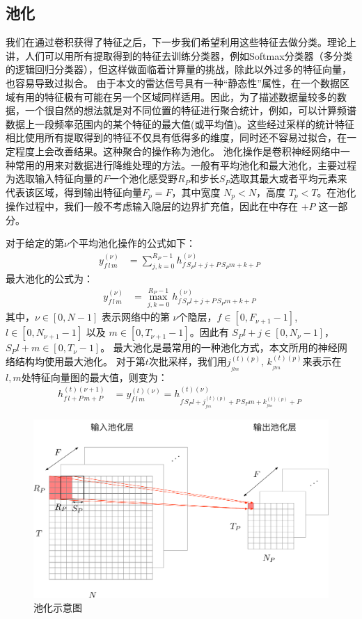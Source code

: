 \subsection{池化}
我们在通过卷积获得了特征之后，下一步我们希望利用这些特征去做分类。理论上讲，人们可以用所有提取得到的特征去训练分类器，例如Softmax分类器（多分类的逻辑回归分类器），但这样做面临着计算量的挑战，除此以外过多的特征向量，也容易导致过拟合。
由于本文的雷达信号具有一种“静态性”属性，在一个数据区域有用的特征极有可能在另一个区域同样适用。因此，为了描述数据量较多的数据，一个很自然的想法就是对不同位置的特征进行聚合统计，例如，可以计算频谱数据上一段频率范围内的某个特征的最大值(或平均值)。这些经过采样的统计特征相比使用所有提取得到的特征不仅具有低得多的维度，同时还不容易过拟合，在一定程度上会改善结果。这种聚合的操作称为池化。
池化操作是卷积神经网络中一种常用的用来对数据进行降维处理的方法。一般有平均池化和最大池化，主要过程为选取输入特征向量的$F$一个池化感受野$R_P$和步长$S_P$选取其最大或者平均元素来代表该区域，得到输出特征向量$F_p=F$，其中宽度 $N_p<N$，高度 $T_p<T$。在池化操作过程中，我们一般不考虑输入隐层的边界扩充值，因此在中存在 $+P$ 这一部分。

对于给定的第$\nu$个平均池化操作的公式如下：
\begin{align}
  y_{f\,l\,m}^{(\nu)}&=\sum^{R_P-1}_{j,k=0} h_{f\,S_P l+j+P\,S_Pm+k+P}^{(\nu)}\;
  \label{equ:pool}
\end{align}
最大池化的公式为：
\begin{align}
  y_{f\,l\,m}^{(\nu)}&=\max^{R_P-1}_{j,k=0} h_{f\,S_P l+j+P\,S_Pm+k+P}^{(\nu)}\;
  \label{equ:maxpool}
\end{align}
其中，$\nu \in [0,N-1 ]$ 表示网络中的第 $\nu$个隐层，$f\in[0,F_{\nu+1}-1]$, $l\in[0,N_{\nu+1}-1 ]$ 以及 $m\in[0,T_{\nu+1}-1 ]$。因此有 $S_Pl+j\in[0,N_\nu-1 ]$， $S_Pl+m\in[0,T_\nu-1 ]$。
最大池化是最常用的一种池化方式，本文所用的神经网络结构均使用最大池化。
对于第$t$次批采样，我们用$j^{(t)(p)}_{_{flm}},\,k^{(t)(p)}_{_{flm}}$来表示在 $l,m$处特征向量图的最大值，则变为：
\begin{align}
h_{f\,l+P\,m+P}^{(t)(\nu+1)}&=y_{f\,l\,m}^{(t)(\nu)}=
%
h^{(t)(\nu)}_{f\,S_P l+j^{(t)(p)}_{_{flm}}+P\,S_Pm+k^{(t)(p)}_{_{flm}}+P}\;
\end{align}

\begin{figure}[!t]
	\centering
	\includegraphics[width=13.5cm]{figures/networks/pooling}
	\caption{池化示意图}
	\label{fig:pool}
\end{figure}

